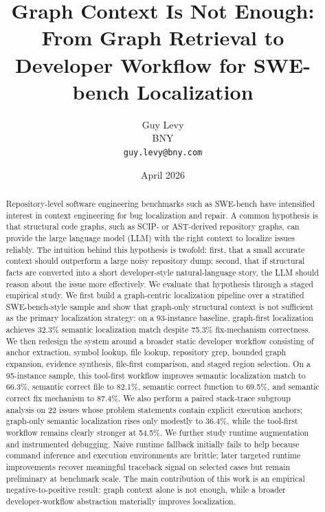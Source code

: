 \documentclass[11pt]{article}
\title{Graph Context Is Not Enough:\\From Graph Retrieval to Developer Workflow for SWE-bench Localization}
\author{
  Guy Levy\\
  BNY\\
  \texttt{guy.levy@bny.com}
}
\date{April 2026}
\begin{document}
\maketitle

\begin{abstract}
Repository-level software engineering benchmarks such as SWE-bench have intensified interest in context engineering for bug localization and repair. A common hypothesis is that structural code graphs, such as SCIP- or AST-derived repository graphs, can provide the large language model (LLM) with the right context to localize issues reliably. The intuition behind this hypothesis is twofold: first, that a small accurate context should outperform a large noisy repository dump; second, that if structural facts are converted into a short developer-style natural-language story, the LLM should reason about the issue more effectively. We evaluate that hypothesis through a staged empirical study. We first build a graph-centric localization pipeline over a stratified SWE-bench-style sample and show that graph-only structural context is not sufficient as the primary localization strategy: on a 93-instance baseline, graph-first localization achieves 32.3\% semantic localization match despite 75.3\% fix-mechanism correctness. We then redesign the system around a broader static developer workflow consisting of anchor extraction, symbol lookup, file lookup, repository grep, bounded graph expansion, evidence synthesis, file-first comparison, and staged region selection. On a 95-instance sample, this tool-first workflow improves semantic localization match to 66.3\%, semantic correct file to 82.1\%, semantic correct function to 69.5\%, and semantic correct fix mechanism to 87.4\%. We also perform a paired stack-trace subgroup analysis on 22 issues whose problem statements contain explicit execution anchors; graph-only semantic localization rises only modestly to 36.4\%, while the tool-first workflow remains clearly stronger at 54.5\%. We further study runtime augmentation and instrumented debugging. Naive runtime fallback initially fails to help because command inference and execution environments are brittle; later targeted runtime improvements recover meaningful traceback signal on selected cases but remain preliminary at benchmark scale. The main contribution of this work is an empirical negative-to-positive result: graph context alone is not enough, while a broader developer-workflow abstraction materially improves localization.
\end{abstract}
\end{document}
